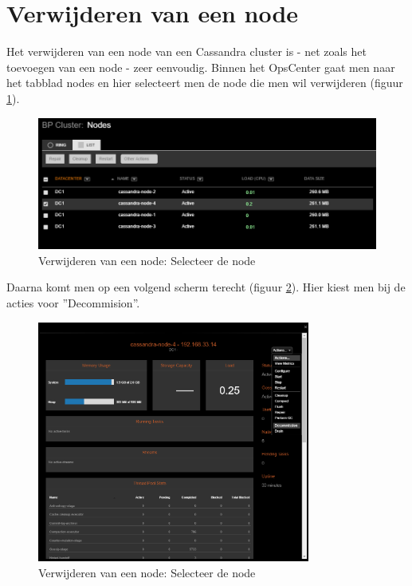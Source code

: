 \section{Verwijderen van een node}
Het verwijderen van een node van een Cassandra cluster is - net zoals het toevoegen van een node - zeer eenvoudig.
Binnen het OpsCenter gaat men naar het tabblad nodes en hier selecteert men de node die men wil verwijderen (figuur \ref{fig:cas_rem_1}).

\begin{figure}[H]
	\centering
	\includegraphics[width=1\textwidth]{img/4_installatie_cassandra/5_Remove_Node_1}
	\caption{Verwijderen van een node: Selecteer de node}
	\label{fig:cas_rem_1}
\end{figure}

Daarna komt men op een volgend scherm terecht (figuur \ref{fig:cas_rem_2}).
Hier kiest men bij de acties voor ''Decommision''.

\begin{figure}[H]
	\centering
	\includegraphics[width=0.8\textwidth]{img/4_installatie_cassandra/5_Remove_Node_2}
	\caption{Verwijderen van een node: Selecteer de node}
	\label{fig:cas_rem_2}
\end{figure}

